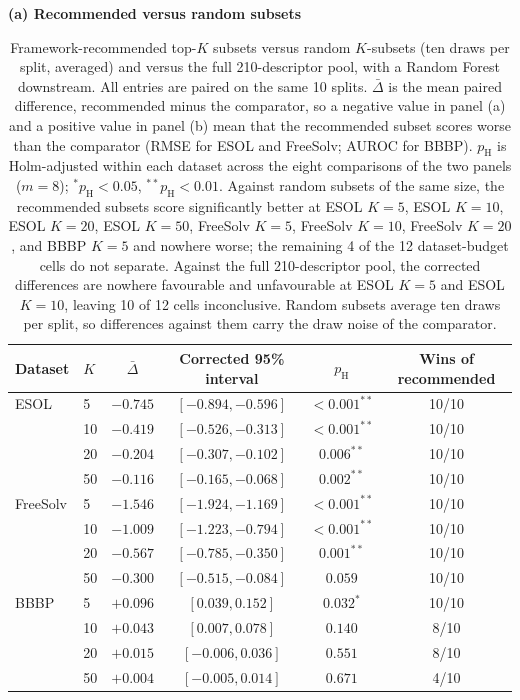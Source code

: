 \begin{table}[H]
\caption{Framework-recommended top-$K$ subsets versus random $K$-subsets (ten draws per split, averaged) and versus the full 210-descriptor pool, with a Random Forest downstream. All entries are paired on the same 10 splits. $\bar\Delta$ is the mean paired difference, recommended minus the comparator, so a negative value in panel (a) and a positive value in panel (b) mean that the recommended subset scores worse than the comparator (RMSE for ESOL and FreeSolv; AUROC for BBBP). $p_{\mathrm{H}}$ is Holm-adjusted within each dataset across the eight comparisons of the two panels ($m=8$); $^{*}p_{\mathrm{H}}<0.05$, $^{**}p_{\mathrm{H}}<0.01$. Against random subsets of the same size, the recommended subsets score significantly better at ESOL $K=5$, ESOL $K=10$, ESOL $K=20$, ESOL $K=50$, FreeSolv $K=5$, FreeSolv $K=10$, FreeSolv $K=20$, and BBBP $K=5$ and nowhere worse; the remaining 4 of the 12 dataset-budget cells do not separate. Against the full 210-descriptor pool, the corrected differences are nowhere favourable and unfavourable at ESOL $K=5$ and ESOL $K=10$, leaving 10 of 12 cells inconclusive. Random subsets average ten draws per split, so differences against them carry the draw noise of the comparator.}\label{tab:rec-random}
\centering\scriptsize
\setlength{\tabcolsep}{4pt}
\textbf{(a) Recommended versus random subsets}\par\smallskip
\begin{tabular}{@{}llcccc@{}}
\toprule
Dataset & $K$ & $\bar\Delta$ & Corrected 95\% interval & $p_{\mathrm{H}}$ & Wins of recommended \\
\midrule
ESOL & 5 & $-0.745$ & $[-0.894,-0.596]$ & $<0.001^{**}$ & 10/10 \\
 & 10 & $-0.419$ & $[-0.526,-0.313]$ & $<0.001^{**}$ & 10/10 \\
 & 20 & $-0.204$ & $[-0.307,-0.102]$ & $0.006^{**}$ & 10/10 \\
 & 50 & $-0.116$ & $[-0.165,-0.068]$ & $0.002^{**}$ & 10/10 \\
\midrule
FreeSolv & 5 & $-1.546$ & $[-1.924,-1.169]$ & $<0.001^{**}$ & 10/10 \\
 & 10 & $-1.009$ & $[-1.223,-0.794]$ & $<0.001^{**}$ & 10/10 \\
 & 20 & $-0.567$ & $[-0.785,-0.350]$ & $0.001^{**}$ & 10/10 \\
 & 50 & $-0.300$ & $[-0.515,-0.084]$ & $0.059$ & 10/10 \\
\midrule
BBBP & 5 & $+0.096$ & $[0.039,0.152]$ & $0.032^{*}$ & 10/10 \\
 & 10 & $+0.043$ & $[0.007,0.078]$ & $0.140$ & 8/10 \\
 & 20 & $+0.015$ & $[-0.006,0.036]$ & $0.551$ & 8/10 \\
 & 50 & $+0.004$ & $[-0.005,0.014]$ & $0.671$ & 4/10 \\
\bottomrule
\end{tabular}


\end{table}
